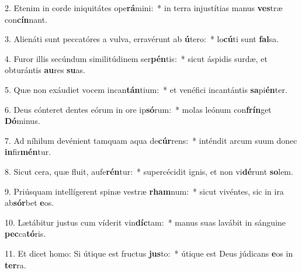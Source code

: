2. Etenim in corde iniquitátes ope\textbf{rá}mini:~*  in terra injustítias manus \textbf{ves}træ con\textbf{cín}nant.\

3. Alienáti sunt peccatóres a vulva, erravérunt ab \textbf{ú}tero:~*  lo\textbf{cú}ti sunt \textbf{fal}sa.\

4. Furor illis secúndum similitúdinem ser\textbf{pén}tis:~*  sicut áspidis surdæ, et obturántis \textbf{au}res \textbf{su}as.\

5. Quæ non exáudiet vocem incan\textbf{tán}tium:~*  et venéfici incantántis \textbf{sa}pi\textbf{én}ter.\

6. Deus cónteret dentes eórum in ore ip\textbf{só}rum:~*  molas leónum con\textbf{frín}get \textbf{Dó}minus.\

7. Ad níhilum devénient tamquam aqua de\textbf{cúr}rens:~*  inténdit arcum suum donec \textbf{in}fir\textbf{mén}tur.\

8. Sicut cera, quæ fluit, aufe\textbf{rén}tur:~*  supercécidit ignis, et non vi\textbf{dé}runt \textbf{so}lem.\

9. Priúsquam intellígerent spinæ vestræ \textbf{rham}num:~*  sicut vivéntes, sic in ira ab\textbf{sór}bet \textbf{e}os.\

10. Lætábitur justus cum víderit vin\textbf{díc}tam:~*  manus suas lavábit in sánguine \textbf{pec}ca\textbf{tó}ris.\

11. Et dicet homo: Si útique est fructus \textbf{jus}to:~*  útique est Deus júdicans \textbf{e}os in \textbf{ter}ra.\

